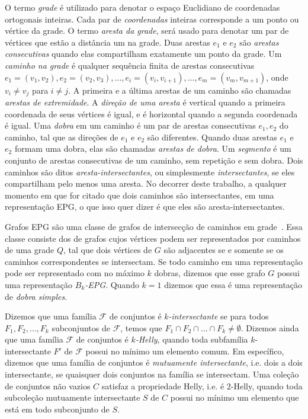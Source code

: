 O termo \emph{grade} é utilizado para denotar o espaço Euclidiano de coordenadas ortogonais inteiras. Cada par de \emph{coordenadas} inteiras corresponde a um ponto ou vértice da grade. O termo \emph{aresta da grade}, será usado para denotar um par de vértices que estão a distância um na grade. Duas arestas $e_1$ e $e_2$ são \emph{arestas consecutivas} quando elas compartilham exatamente um ponto da grade.
 Um \emph{caminho na grade} é qualquer sequência finita de arestas consecutivas $e_1 = (v_1, v_{2}), e_2 = (v_2, v_{3}), \dots, e_i = (v_i, v_{i+1}), \dots, e_m = (v_{m}, v_{m+1})$,  onde   $v_i \neq v_j$ para $i \neq j$. A primeira e a última arestas de um caminho são chamadas \emph{arestas de extremidade}.
A \emph{direção de uma aresta} é vertical quando a primeira coordenada de seus vértices é igual, e é horizontal quando a segunda coordenada é igual. Uma \emph {dobra} em um caminho é um par de arestas consecutivas $ e_1, e_2 $ do caminho, tal que as direções de $ e_1$ e $ e_2$ são diferentes. Quando duas arestas $ e_1$ e $e_2 $ formam uma dobra, elas são chamadas \emph {arestas de dobra}. Um \emph {segmento} é um conjunto de arestas consecutivas de um caminho, sem repetição e sem dobra. %
 Dois caminhos são ditos   \emph{aresta-intersectantes}, ou simplesmente  \emph{intersectantes}, se eles compartilham pelo menos uma aresta. %
 No decorrer deste trabalho, a qualquer momento em que for citado que dois caminhos são intersectantes, em uma representação EPG, o que isso quer dizer é que eles são aresta-intersectantes. 
 
Grafos EPG são uma classe de grafos de intersecção de caminhos em grade~\cite{golumbic2009}. Essa classe consiste dos de grafos cujos vértices podem ser representados por caminhos de uma grade $ Q $, tal que dois vértices de  $ G $ são adjacentes se e somente se os caminhos correspondentes se intersectam. Se todo caminho em uma representação pode ser representado com no máximo $ k $ dobras, dizemos que esse grafo $ G $ possui uma representação \emph{$ B_k$-EPG}. Quando $ k = 1 $ dizemos que essa é uma representação de \emph{dobra simples}.


Dizemos que uma família $\mathcal{F}$ de conjuntos  é \emph{$k$-intersectante} se para todos $F_1, F_2, \dots, F_k$ subconjuntos de $\mathcal{F}$, temos que $F_1\cap F_2 \cap \dots \cap F_k \neq \emptyset$. Dizemos ainda que uma família $\mathcal{F}$  de conjuntos é \emph{$k$-Helly}, quando toda subfamília  $k$-intersectante $F'$ de $\mathcal{F}$ possui no mínimo um elemento comum.
Em específico, dizemos que uma família de conjuntos é  \emph{mutuamente intersectante}, i.e. dois a dois intersectante, se quaisquer dois conjuntos na família se intersectam. Uma coleção de conjuntos não vazios $C$ satisfaz a propriedade Helly, i.e. é $2$-Helly, quando toda subcoleção mutuamente intersectante $S$ de $ C $ possui no mínimo um elemento que está em todo subconjunto de $S$.

